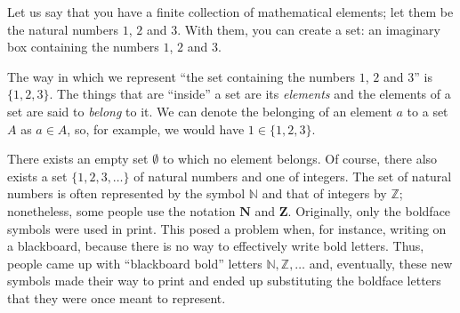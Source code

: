 \begin{para}
Let us say that you have a finite collection of mathematical elements; let them be the natural numbers $1$, $2$ and $3$.
With them, you can create a set: an imaginary box containing the numbers $1$, $2$ and $3$.

The way in which we represent ``the set containing the numbers $1$, $2$ and $3$'' is $\{1, 2, 3\}$.
The things that are ``inside'' a set are its \emph{elements} and the elements of a set are said to \emph{belong} to it.
We can denote the belonging of an element $a$ to a set $A$ as $a\in A$, so, for example, we would have $1\in\{1,2,3\}$.

There exists an empty set $\emptyset$ to which no element belongs.
Of course, there also exists a set $\{1,2,3,\ldots\}$ of natural numbers and one of integers. 
The set of natural numbers is often represented by the symbol $\mathbb{N}$ and that of integers by $\mathbb{Z}$; nonetheless, some people use the notation $\mathbf{N}$ and $\mathbf{Z}$.
Originally, only the boldface symbols were used in print.
This posed a problem when, for instance, writing on a blackboard, because there is no way to effectively write bold letters.
Thus, people came up with ``blackboard bold'' letters $\mathbb{N},\mathbb{Z},\ldots$ and, eventually, these new symbols made their way to print and ended up substituting the boldface letters that they were once meant to represent.
\end{para}

